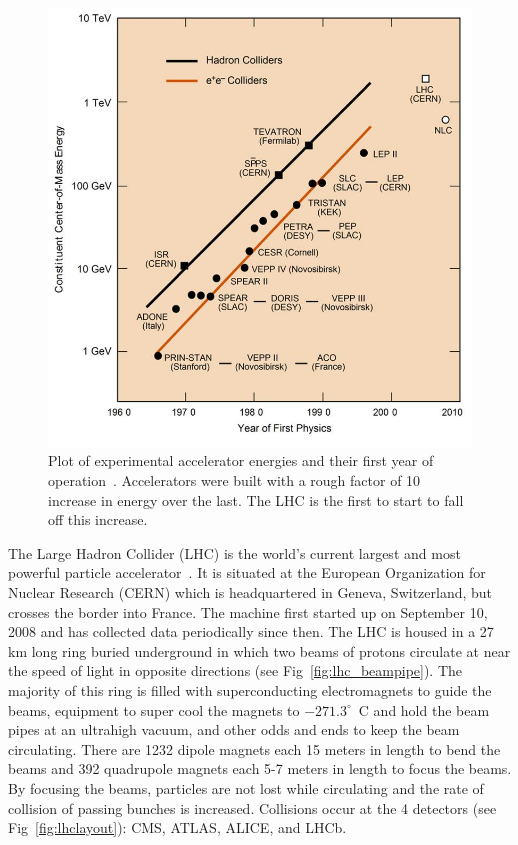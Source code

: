 		\begin{figure}[h]
		\begin{center}
\includegraphics[width=0.9\linewidth]{Figs/collider_energy.jpg}
\end{center}
\caption{\label{fig:experiment_energies}
Plot of experimental accelerator energies and their first year of operation~\cite{comenergy}. Accelerators were built with a rough factor of 10 increase in energy over the last. The LHC is the first to start to fall off this increase.
}
\end{figure} 
	
	The Large Hadron Collider (LHC) is the world's current largest and most powerful particle accelerator~\cite{cernlhc}. It is situated at the European Organization for Nuclear Research (CERN) which is headquartered in Geneva, Switzerland, but crosses the border into France. The machine first started up on September 10, 2008 and has collected data periodically since then. The LHC is housed in a 27 km long ring buried underground in which two beams of protons circulate at near the speed of light in opposite directions (see Fig~\ref{fig:lhc_beampipe}). The majority of this ring is filled with superconducting electromagnets to guide the beams, equipment to super cool the magnets to $-271.3^\circ$~C and hold the beam pipes at an ultrahigh vacuum, and other odds and ends to keep the beam circulating. There are 1232 dipole magnets each 15 meters in length to bend the beams and 392 quadrupole magnets  each 5-7 meters in length to focus the beams. By focusing the beams, particles are not lost while circulating and the rate of collision of passing bunches is increased. Collisions occur at the 4 detectors (see Fig~\ref{fig:lhclayout}): CMS, ATLAS, ALICE, and LHCb.
	
